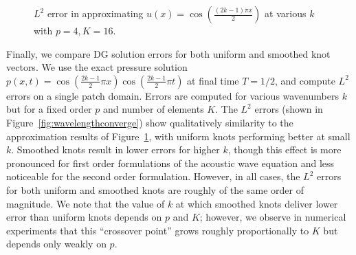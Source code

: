 \documentclass[preprint,10pt]{elsarticle}
\newcommand{\LRp}[1]{\left( #1 \right)}
\begin{document}
\begin{figure}
\centering
{}
\hspace{.5em}
\caption{$L^2$ error in approximating $u(x) = \cos\LRp{\frac{(2k-1)\pi x}{2}}$ at various $k$ with $p = 4, K = 16$.}
\label{fig:ppw}
\end{figure}

Finally, we compare DG solution errors for both uniform and smoothed knot vectors.  We use the exact pressure solution $p(x,t) = \cos\LRp{\frac{2k-1}{2}\pi x}\cos\LRp{\frac{2k-1}{2}\pi t}$  at final time $T=1/2$, and compute $L^2$ errors on a single patch domain.  Errors are computed for various wavenumbers $k$ but for a fixed order $p$ and number of elements $K$.  The $L^2$ errors (shown in Figure~\ref{fig:wavelengthconverge}) show qualitatively similarity to the approximation results of Figure~\ref{fig:ppw}, with uniform knots performing better at small $k$.  Smoothed knots result in lower errors for higher $k$, though this effect is more pronounced for first order formulations of the acoustic wave equation and less noticeable for the second order formulation.  However, in all cases, the $L^2$ errors for both uniform and smoothed knots are roughly of the same order of magnitude.  We note that the value of $k$ at which smoothed knots deliver lower error than uniform knots depends on $p$ and $K$; however, we observe in numerical experiments that this ``crossover point'' grows roughly proportionally to $K$ but depends only weakly on $p$.  
\end{document}
